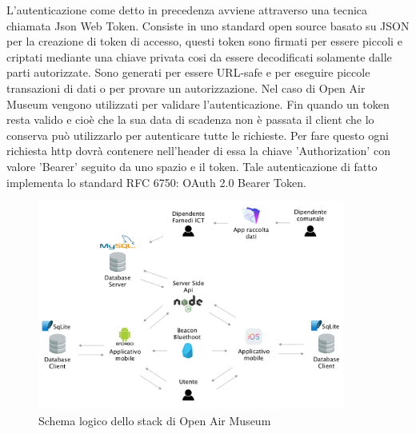 L'autenticazione come detto in precedenza avviene attraverso una tecnica chiamata Json Web Token\cite{JWT}. Consiste in uno standard open source basato su JSON per la creazione di token di accesso, questi token sono firmati per essere piccoli e criptati mediante una chiave privata cosi da essere decodificati solamente dalle parti autorizzate. Sono generati per essere URL-safe e per eseguire piccole transazioni di dati o per provare un autorizzazione. Nel caso di Open Air Museum vengono utilizzati per validare l'autenticazione. Fin quando un token resta valido e cioè che la sua data di scadenza non è passata il client che lo conserva può utilizzarlo per autenticare tutte le richieste. Per fare questo ogni richiesta http dovrà contenere nell'header di essa la chiave 'Authorization' con valore 'Bearer' seguito da uno spazio e il token. Tale autenticazione di fatto implementa lo standard RFC 6750: OAuth 2.0 Bearer Token\cite{Bearer}.

\begin{figure}[h]
\centering
\includegraphics[width=0.9\textwidth]{images/SchemaOpenAirMuseum.png}
\caption{Schema logico dello stack di Open Air Museum}
\end{figure}








